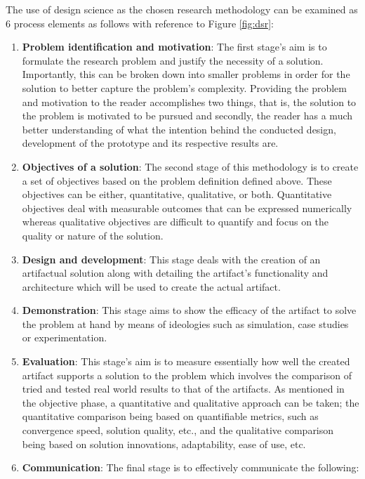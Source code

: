 \parbreak\noindent The use of design science as the chosen research methodology can be examined as 6 process elements as follows with reference to Figure \ref{fig:dsr}:

\begin{enumerate}
    \item \textbf{Problem identification and motivation}: The first stage's aim is to formulate the research problem and justify the necessity of a solution. Importantly, this can be broken down into smaller problems in order for the solution to better capture the problem's complexity. Providing the problem and motivation to the reader accomplishes two things, that is, the solution to the problem is motivated to be pursued and secondly, the reader has a much better understanding of what the intention behind the conducted design, development of the prototype and its respective results are.
    \item \textbf{Objectives of a solution}: The second stage of this methodology is to create a set of objectives based on the problem definition defined above. These objectives can be either, quantitative, qualitative, or both. Quantitative objectives deal with measurable outcomes that can be expressed numerically whereas qualitative objectives are difficult to quantify and focus on the quality or nature of the solution.
    \item \textbf{Design and development}: This stage deals with the creation of an artifactual solution along with detailing the artifact's functionality and architecture which will be used to create the actual artifact.
    \item \textbf{Demonstration}: This stage aims to show the efficacy of the artifact to solve the problem at hand by means of ideologies such as simulation, case studies or experimentation.
    \item \textbf{Evaluation}: This stage's aim is to measure essentially how well the created artifact supports a solution to the problem which involves the comparison of tried and tested real world results to that of the artifacts. As mentioned in the objective phase, a quantitative and qualitative approach can be taken; the quantitative comparison being based on quantifiable metrics, such as convergence speed, solution quality, etc., and the qualitative comparison being based on solution innovations, adaptability, ease of use, etc.
    \item \textbf{Communication}: The final stage is to effectively communicate the following:
    \begin{itemize}

\end{itemize}
\end{enumerate}
